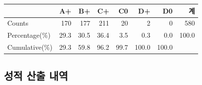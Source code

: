 \documentclass[
]{article}
\begin{document}
\begin{longtable}[]{@{}lrrrrrrr@{}}
\toprule\noalign{}
& A+ & B+ & C+ & C0 & D+ & D0 & 계 \\
\midrule\noalign{}
\endhead
\bottomrule\noalign{}
\endlastfoot
Counts & 170 & 177 & 211 & 20 & 2 & 0 & 580 \\
Percentage(\%) & 29.3 & 30.5 & 36.4 & 3.5 & 0.3 & 0.0 & 100.0 \\
Cumulative(\%) & 29.3 & 59.8 & 96.2 & 99.7 & 100.0 & 100.0 & \\
\end{longtable}

\newpage

\subsection{성적 산출
내역}\label{uxc131uxc801-uxc0b0uxcd9c-uxb0b4uxc5ed}
\end{document}
